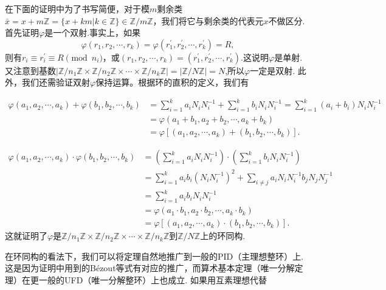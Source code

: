 \documentclass[color=green,mathpazo,titlestyle=hang]{elegantbook}
\begin{document}
  \begin{newproof}
	在下面的证明中为了书写简便，对于模$m$剩余类$\bar{x}=x+m\mathbb{Z}=\{x+km|k\in\mathbb{Z}\}\in \mathbb{Z}/m\mathbb{Z}$，我们将它与剩余类的代表元$x$不做区分. 首先证明$\varphi$是一个双射.事实上，如果
	\[
	\varphi(r_1,r_2,\cdots,r_k)=\varphi(r_1^{'},r_2^{'},\cdots,r_k^{'})=R,
	\]
	则有$r_i\equiv r_i^{'}\equiv R \pmod{n_i} $，或$(r_1,r_2,\cdots,r_k)=(r_1^{'},r_2^{'},\cdots,r_k^{'}).$这说明$\varphi$是单射.
	又注意到基数$\left|\mathbb{Z}/n_1\mathbb{Z}\times\mathbb{Z}/n_2\mathbb{Z}\times\cdots\times\mathbb{Z}/n_k\mathbb{Z}\right|=\left|\mathbb{Z}/N\mathbb{Z}\right|=N$,所以$\varphi$一定是双射.
	此外，我们还需验证双射$\varphi$保持运算。根据环的直积的定义，我们有
	
	\begin{equation*}	
	\begin{aligned}
	\varphi(a_1,a_2,\cdots,a_k)+\varphi(b_1,b_2,\cdots,b_k)	
	&=\sum_{i=1}^{k}a_iN_i N_i^{-1}+\sum_{i=1}^{k}b_iN_i N_i^{-1}=\sum_{i=1}^{k}(a_i+b_i)N_i N_i^{-1}\\
	&=\varphi(a_1+b_1,a_2+b_2,\cdots,a_k+b_k)\\
	&=\varphi[(a_1,a_2,\cdots,a_k)+(b_1,b_2,\cdots,b_k)].
	\end{aligned}		
	\end{equation*}
	
	\begin{equation*}	
	\begin{aligned}
	\varphi(a_1,a_2,\cdots,a_k)\cdot\varphi(b_1,b_2,\cdots,b_k)	
	&=\left(\sum_{i=1}^{k}a_iN_i N_i^{-1}\right)\cdot\left(\sum_{i=1}^{k}b_iN_i N_i^{-1}\right)\\
	&=\sum_{i=1}^{k}a_i b_i (N_i N_i^{-1})^2+\sum_{i\ne j}a_iN_i N_i^{-1}b_jN_j N_j^{-1}\\
	&=\sum_{i=1}^{k}a_i b_i N_i N_i^{-1}\\
	&=\varphi(a_1\cdot b_1,a_2\cdot b_2,\cdots,a_k\cdot b_k)\\
	&=\varphi[(a_1,a_2,\cdots,a_k)\cdot(b_1,b_2,\cdots,b_k)].
	\end{aligned}		
	\end{equation*}  
    这就证明了$\varphi$是$\mathbb{Z}/n_1\mathbb{Z}\times\mathbb{Z}/n_2\mathbb{Z}\times\cdots\times\mathbb{Z}/n_k\mathbb{Z}$到$\mathbb{Z}/N\mathbb{Z}$上的环同构.

  \end{newproof}

  在环同构的看法下，我们可以将定理自然地推广到一般的PID（主理想整环）上.  这是因为证明中用到的B\'{e}zout等式有对应的推广，而算术基本定理（唯一分解定理）在更一般的UFD（唯一分解整环）上也成立. 如果用互素理想代替



\end{document}
